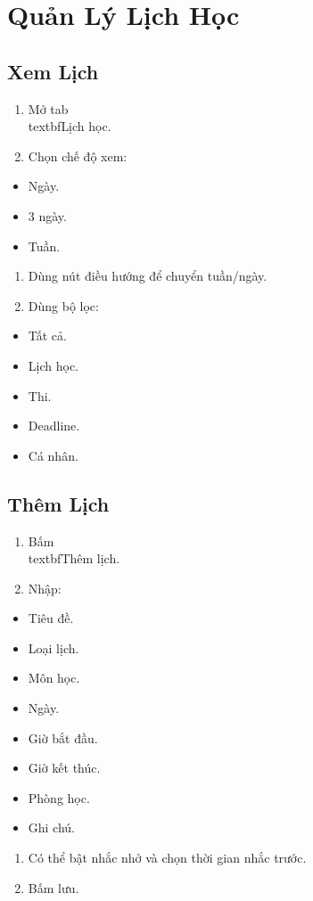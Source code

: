 \documentclass[12pt,a4paper]{report}
\begin{document}
\section{Quản Lý Lịch Học}

\subsection{Xem Lịch}

\begin{enumerate}
\item Mở tab \\textbf{Lịch học}.
\item Chọn chế độ xem:
\end{enumerate}
\begin{itemize}
\item Ngày.
\item 3 ngày.
\item Tuần.
\end{itemize}
\begin{enumerate}
\item Dùng nút điều hướng để chuyển tuần/ngày.
\item Dùng bộ lọc:
\end{enumerate}
\begin{itemize}
\item Tất cả.
\item Lịch học.
\item Thi.
\item Deadline.
\item Cá nhân.
\end{itemize}

\subsection{Thêm Lịch}

\begin{enumerate}
\item Bấm \\textbf{Thêm lịch}.
\item Nhập:
\end{enumerate}
\begin{itemize}
\item Tiêu đề.
\item Loại lịch.
\item Môn học.
\item Ngày.
\item Giờ bắt đầu.
\item Giờ kết thúc.
\item Phòng học.
\item Ghi chú.
\end{itemize}
\begin{enumerate}
\item Có thể bật nhắc nhở và chọn thời gian nhắc trước.
\item Bấm lưu.
\end{enumerate}
\end{document}
